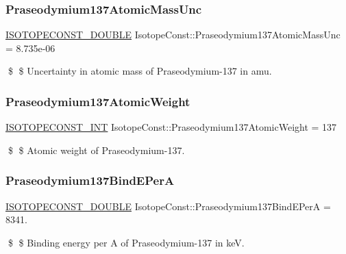 \subsubsection{\texorpdfstring{Praseodymium137\+Atomic\+Mass\+Unc}{Praseodymium137AtomicMassUnc}}
{\footnotesize\ttfamily \mbox{\hyperlink{group___isotope_const-_macros_ga8f45a7272ce02c0b4c65c44636ed719a}{I\+S\+O\+T\+O\+P\+E\+C\+O\+N\+S\+T\+\_\+\+D\+O\+U\+B\+LE}} Isotope\+Const\+::\+Praseodymium137\+Atomic\+Mass\+Unc = 8.\+735e-\/06}

\$ \$ Uncertainty in atomic mass of Praseodymium-\/137 in amu. \mbox{\label{group___isotope_const-_praseodymium-_pr137_ga63dbe0ab768b8c4ada74b626986f4ced}} 
\subsubsection{\texorpdfstring{Praseodymium137\+Atomic\+Weight}{Praseodymium137AtomicWeight}}
{\footnotesize\ttfamily \mbox{\hyperlink{group___isotope_const-_macros_ga5f18360b3e99483a35c32d789e62621c}{I\+S\+O\+T\+O\+P\+E\+C\+O\+N\+S\+T\+\_\+\+I\+NT}} Isotope\+Const\+::\+Praseodymium137\+Atomic\+Weight = 137}

\$ \$ Atomic weight of Praseodymium-\/137. \mbox{\label{group___isotope_const-_praseodymium-_pr137_gae4cc1bc6914d27ef594de0dca0874e7d}} 
\subsubsection{\texorpdfstring{Praseodymium137\+Bind\+E\+PerA}{Praseodymium137BindEPerA}}
{\footnotesize\ttfamily \mbox{\hyperlink{group___isotope_const-_macros_ga8f45a7272ce02c0b4c65c44636ed719a}{I\+S\+O\+T\+O\+P\+E\+C\+O\+N\+S\+T\+\_\+\+D\+O\+U\+B\+LE}} Isotope\+Const\+::\+Praseodymium137\+Bind\+E\+PerA = 8341.}

\$ \$ Binding energy per A of Praseodymium-\/137 in keV. \mbox{\label{group___isotope_const-_praseodymium-_pr137_ga73fa1c7e1553b4e090f7ede9af1d3e2e}} 
